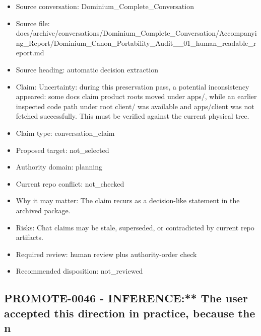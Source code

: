 \documentclass[11pt,a4paper]{report}
\begin{document}
\begin{itemize}
\item Source conversation: Dominium\_Complete\_Conversation
\item Source file: docs/archive/conversations/Dominium\_Complete\_Conversation/Accompanying\_Report/Dominium\_Canon\_Portability\_Audit\_\_01\_human\_readable\_report.md
\item Source heading: automatic decision extraction
\item Claim: Uncertainty: during this preservation pass, a potential inconsistency appeared: some docs claim product roots moved under apps/, while an earlier inspected code path under root client/ was available and apps/client was not fetched successfully. This must be verified against the current physical tree.
\item Claim type: conversation\_claim
\item Proposed target: not\_selected
\item Authority domain: planning
\item Current repo conflict: not\_checked
\item Why it may matter: The claim recurs as a decision-like statement in the archived package.
\item Risks: Chat claims may be stale, superseded, or contradicted by current repo artifacts.
\item Required review: human review plus authority-order check
\item Recommended disposition: not\_reviewed
\end{itemize}

\subsection{PROMOTE-0046 - INFERENCE:** The user accepted this direction in practice, because the n}
\end{document}
